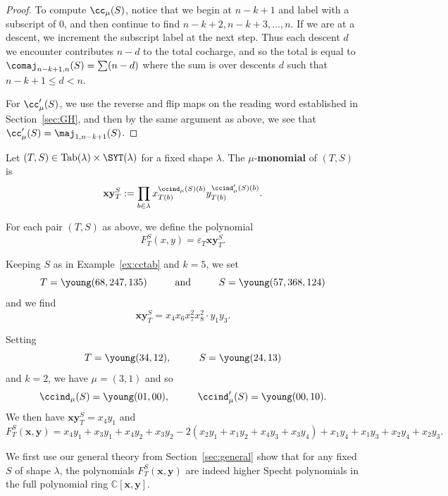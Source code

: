 \begin{proof}
	To compute $\cc_\mu(S)$, notice that we begin at $n-k+1$ and label with a subscript of $0$, and then continue to find $n-k+2,n-k+3,\ldots,n$.  If we are at a descent, we increment the subscript label at the next step.  Thus each descent $d$ we encounter contributes $n-d$ to the total cocharge, and so the total is equal to $\comaj_{n-k+1,n}(S)=\sum(n-d)$ where the sum is over descents $d$ such that $n-k+1\le d<n$.
	
	For $\cc'_\mu(S)$, we use the reverse and flip maps on the reading word established in Section~\ref{sec:GH}, and then by the same argument as above, we see that $\cc'_\mu(S)=\maj_{1,n-k+1}(S)$.
\end{proof}

\begin{definition}
	Let $(T,S)\in \mathrm{Tab}(\lambda)\times \SYT(\lambda)$ for a fixed shape $\lambda$. The $\mu$-\textbf{monomial} of $(T,S)$ is $$\mathbf{xy}_T^S:=\prod_{b\in \lambda} x_{T(b)}^{\ccind_\mu(S)(b)} y_{T(b)}^{\ccind'_\mu(S)(b)}.$$  
\end{definition}
\begin{definition}
	For each pair $(T,S)$ as above, we define the polynomial $$F_{T}^S(x,y)=\varepsilon_T \mathbf{xy}_T^S.$$
\end{definition}

\begin{example}
	Keeping $S$ as in Example~\ref{ex:cctab} and $k=5$, we set $$T=\young(68,247,135)\hspace{1cm}\text{and} \hspace{1cm}S=\young(57,368,124)$$ and we find $$\mathbf{xy}^S_T=x_{4}x_6x_7^2x_8^2\cdot y_1y_3.$$
\end{example}

\begin{example}
	Setting $$T=\young(34,12), \hspace{1cm}S=\young(24,13)$$ and $k=2$, we have $\mu=(3,1)$ and so $$\ccind_\mu(S)=\young(01,00),\hspace{1cm}\ccind_\mu'(S)=\young(00,10).$$  We then have  $\mathbf{xy}^S_T=x_4y_1$ and {\small $$F_T^S(\mathbf{x},\mathbf{y})= x_4y_1 + x_3y_1 + x_4y_2 + x_3y_2 - 2 (x_2y_1 + x_1y_2 + x_4y_3 + x_3y_4)+ x_1y_4 + x_1y_3 + x_2y_4 + x_2y_3.$$}
\end{example}


We first use our general theory from Section~\ref{sec:general} show that for any fixed $S$ of shape $\lambda$, the polynomials $F_T^S(\mathbf{x},\mathbf{y})$ are indeed higher Specht polynomials in the full polynomial ring $\mathbb{C}[\mathbf{x},\mathbf{y}]$.

